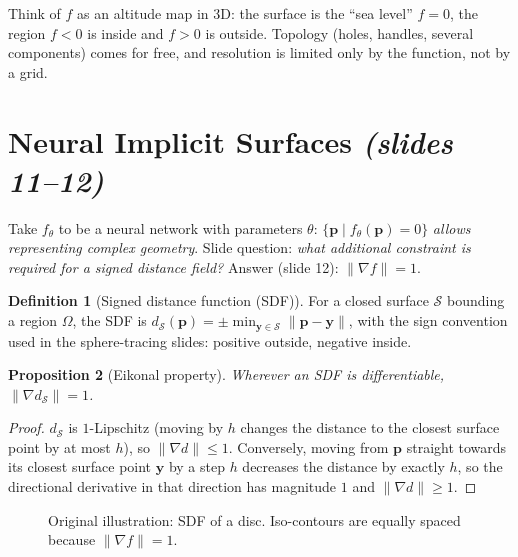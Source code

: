 \documentclass[11pt,a4paper]{article}
\newcommand{\bp}{{\bm{p}}}
\theoremstyle{definition}
\newtheorem{definition}{Definition}[section]
\theoremstyle{plain}
\newtheorem{proposition}[definition]{Proposition}
\theoremstyle{remark}
\begin{document}
\begin{intuition}
Think of $f$ as an altitude map in 3D: the surface is the ``sea level'' $f=0$, the region $f<0$ is inside and $f>0$
is outside. Topology (holes, handles, several components) comes for free, and resolution is limited only by the
function, not by a grid.
\end{intuition}

\section{Neural Implicit Surfaces \emph{(slides 11--12)}}
Take $f_\theta$ to be a neural network with parameters $\theta$: $\{\bp\mid f_\theta(\bp)=0\}$ \emph{allows representing
complex geometry}. Slide question: \emph{what additional constraint is required for a signed distance field?}
Answer (slide 12): $\|\nabla f\|=1$.

\begin{definition}[Signed distance function (SDF)]\label{def:sdf}
For a closed surface $\mathcal S$ bounding a region $\Omega$, the SDF is
$d_{\mathcal S}(\bp)=\pm\min_{\bm y\in\mathcal S}\|\bp-\bm y\|$, with the sign convention used in the sphere-tracing
slides: positive outside, negative inside.
\end{definition}

\begin{proposition}[Eikonal property]\label{prop:eikonal}
Wherever an SDF is differentiable, $\|\nabla d_{\mathcal S}\|=1$.
\end{proposition}
\begin{proof}
$d_{\mathcal S}$ is $1$-Lipschitz (moving by $h$ changes the distance to the closest surface point by at most $h$), so
$\|\nabla d\|\le 1$. Conversely, moving from $\bp$ straight towards its closest surface point $\bm y$ by a step $h$
decreases the distance by exactly $h$, so the directional derivative in that direction has magnitude $1$ and
$\|\nabla d\|\ge 1$.
\end{proof}

\begin{figure}[htbp]
\centering
{}
\caption{Original illustration: SDF of a disc. Iso-contours are equally spaced because $\|\nabla f\|=1$.}
\end{figure}
\end{document}
